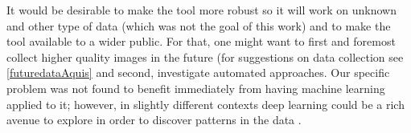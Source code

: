 







It would be desirable to make the tool more robust so it will work on unknown and other type of data (which was not the goal of this work) and to make the tool available to a wider public. For that, one might want to first and foremost collect higher quality images in the future (for suggestions on data collection see \ref{futuredataAquis} and second, investigate automated approaches. %
Our specific problem was not found to benefit immediately from having machine learning applied to it; however, in slightly different contexts deep learning could be a rich avenue to explore in order to discover patterns in the data \cite{pound2017deep,lee2018automated}.






